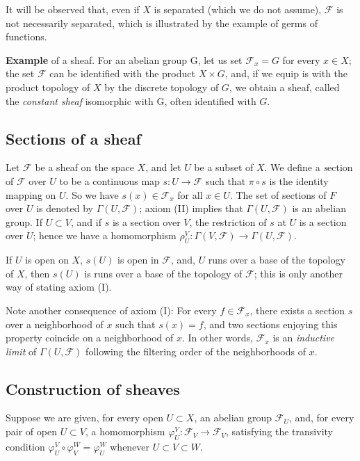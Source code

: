 \documentclass{book}
\newcounter{para}
\begin{document}
It will be observed that, even if $X$ is separated (which we do not assume), $\mathcal F$ is not necessarily separated, which is illustrated by the example of germs of functions. 

\textbf{Example} of a sheaf. For an abelian group G, let us set $\mathcal F_x = G$ for every $x \in X$; the set $\mathcal F$ can be identified with the product $X \times G$, and, if we equip is with the product topology of $X$ by the discrete topology of $G$, we obtain a sheaf, called the \textit{constant sheaf} isomorphic with G, often identified with $G$.

\subsection{Sections of a sheaf}

Let $\mathcal F$ be a sheaf on the space $X$, and let $U$ be a subset of $X$. We define a \textit section of $\mathcal F$ over $U$ to be a continuous map $s: U \rightarrow \mathcal F$ such that $\pi \circ s$ is the identity mapping on $U$. So we have $s(x) \in \mathcal F_x$ for all $x \in U$. The set of sections of $F$ over $U$ is denoted by $\Gamma (U, \mathcal F)$; axiom (II) implies that $\Gamma (U, \mathcal F)$ is an abelian group. If $U \subset V$, and if $s$ is a section over $V$, the restriction of $s$ at $U$ is a section over $U$; hence we have a homomorphism $\rho_U^V: \Gamma (V, \mathcal F) \rightarrow \Gamma (U, \mathcal F)$. 

If $U$ is open on $X$, $s(U)$ is open in $\mathcal F$, and, $U$ runs over a base of the topology of $X$, then $s(U)$ is runs over a base of the topology of $\mathcal F$; this is only another way of stating axiom (I). 

Note another consequence of axiom (I): For every $f \in \mathcal F_x$, there exists a section $s$ over a neighborhood of $x$ such that $s(x) = f$, and two sections enjoying this property coincide on a neighborhood of $x$. In other words, $\mathcal F_x$ is an \textit{inductive limit} of $\Gamma (U, \mathcal F)$ following the filtering order of the neighborhoods of $x$. 

\subsection{Construction of sheaves}

Suppose we are given, for every open $U \subset X$, an abelian group $\mathcal F_U$, and, for every pair of open $U \subset V$, a homomorphism $\varphi_U^V: \mathcal F_V \rightarrow \mathcal F_V$, satisfying the transivity condition $\varphi_U^V \circ \varphi_V^W = \varphi_U^W$  whenever $U \subset V \subset W$. 
\end{document}
